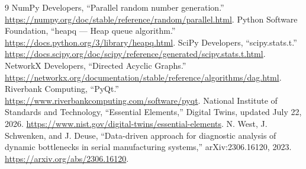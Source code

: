 \documentclass[a4paper,11pt]{ltjsarticle}
\begin{document}
\begin{thebibliography}{9}
 NumPy Developers, ``Parallel random number generation.''
\url{https://numpy.org/doc/stable/reference/random/parallel.html}.
 Python Software Foundation, ``heapq --- Heap queue algorithm.''
\url{https://docs.python.org/3/library/heapq.html}.
 SciPy Developers, ``scipy.stats.t.''
\url{https://docs.scipy.org/doc/scipy/reference/generated/scipy.stats.t.html}.
 NetworkX Developers, ``Directed Acyclic Graphs.''
\url{https://networkx.org/documentation/stable/reference/algorithms/dag.html}.
 Riverbank Computing, ``PyQt.''
\url{https://www.riverbankcomputing.com/software/pyqt}.
 National Institute of Standards and Technology, ``Essential Elements,''
Digital Twins, updated July 22, 2026.
\url{https://www.nist.gov/digital-twins/essential-elements}.
 N. West, J. Schwenken, and J. Deuse,
``Data-driven approach for diagnostic analysis of dynamic bottlenecks in serial manufacturing systems,''
arXiv:2306.16120, 2023. \url{https://arxiv.org/abs/2306.16120}.
\end{thebibliography}
\end{document}
